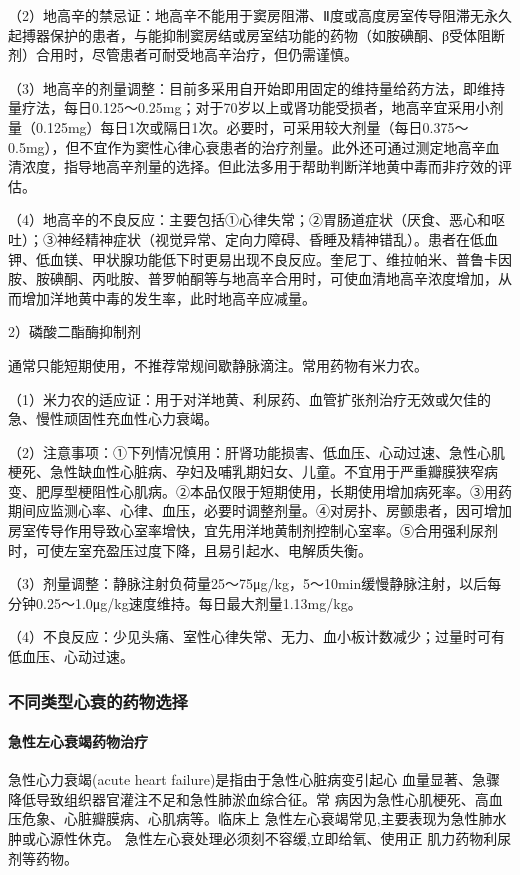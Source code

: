 （2）地高辛的禁忌证：地高辛不能用于窦房阻滞、Ⅱ度或高度房室传导阻滞无永久起搏器保护的患者，与能抑制窦房结或房室结功能的药物（如胺碘酮、β受体阻断剂）合用时，尽管患者可耐受地高辛治疗，但仍需谨慎。

（3）地高辛的剂量调整：目前多采用自开始即用固定的维持量给药方法，即维持量疗法，每日0.125～0.25mg；对于70岁以上或肾功能受损者，地高辛宜采用小剂量（0.125mg）每日1次或隔日1次。必要时，可采用较大剂量（每日0.375～0.5mg），但不宜作为窦性心律心衰患者的治疗剂量。此外还可通过测定地高辛血清浓度，指导地高辛剂量的选择。但此法多用于帮助判断洋地黄中毒而非疗效的评估。

（4）地高辛的不良反应：主要包括①心律失常；②胃肠道症状（厌食、恶心和呕吐）；③神经精神症状（视觉异常、定向力障碍、昏睡及精神错乱）。患者在低血钾、低血镁、甲状腺功能低下时更易出现不良反应。奎尼丁、维拉帕米、普鲁卡因胺、胺碘酮、丙吡胺、普罗帕酮等与地高辛合用时，可使血清地高辛浓度增加，从而增加洋地黄中毒的发生率，此时地高辛应减量。

2）磷酸二酯酶抑制剂

通常只能短期使用，不推荐常规间歇静脉滴注。常用药物有米力农。

（1）米力农的适应证：用于对洋地黄、利尿药、血管扩张剂治疗无效或欠佳的急、慢性顽固性充血性心力衰竭。

（2）注意事项：①下列情况慎用：肝肾功能损害、低血压、心动过速、急性心肌梗死、急性缺血性心脏病、孕妇及哺乳期妇女、儿童。不宜用于严重瓣膜狭窄病变、肥厚型梗阻性心肌病。②本品仅限于短期使用，长期使用增加病死率。③用药期间应监测心率、心律、血压，必要时调整剂量。④对房扑、房颤患者，因可增加房室传导作用导致心室率增快，宜先用洋地黄制剂控制心室率。⑤合用强利尿剂时，可使左室充盈压过度下降，且易引起水、电解质失衡。

（3）剂量调整：静脉注射负荷量25～75μg/kg，5～10min缓慢静脉注射，以后每分钟0.25～1.0μg/kg速度维持。每日最大剂量1.13mg/kg。

（4）不良反应：少见头痛、室性心律失常、无力、血小板计数减少；过量时可有低血压、心动过速。

\subsubsection{不同类型心衰的药物选择}
\paragraph{急性左心衰竭药物治疗}
急性心力衰竭(acute heart failure)是指由于急性心脏病变引起心
血量显著、急骤降低导致组织器官灌注不足和急性肺淤血综合征。常
病因为急性心肌梗死、高血压危象、心脏瓣膜病、心肌病等。临床上
急性左心衰竭常见,主要表现为急性肺水肿或心源性休克。 
急性左心衰处理必须刻不容缓,立即给氧、使用正
肌力药物利尿剂等药物。

